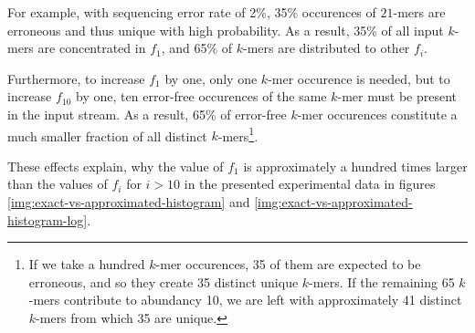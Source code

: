 For example, with sequencing error rate of 2\%, 35\% occurences of $21$-mers are erroneous and thus
unique with high probability. As a result, 35\% of all input $k$-mers are concentrated in $f_1$, and
65\% of $k$-mers are distributed to other $f_i$. 

Furthermore, to increase $f_1$ by one, only one $k$-mer occurence is needed, but to increase
$f_{10}$ by one, ten error-free occurences of the same $k$-mer must be present in the input stream. 
As a result, 65\% of error-free $k$-mer occurences constitute a much smaller fraction of all 
distinct $k$-mers\footnote{If we take a hundred $k$-mer occurences, 35 of them are expected
to be erroneous, and so they create 35 distinct unique $k$-mers. If the remaining 65 $k$-mers 
contribute to abundancy 10, we are left with approximately 41 distinct $k$-mers from which 
35 are unique.}.

These effects explain, why the value of $f_1$ is approximately a hundred times larger than
the values of $f_i$ for $i>10$ in the presented experimental data in figures
\ref{img:exact-vs-approximated-histogram} and \ref{img:exact-vs-approximated-histogram-log}.

